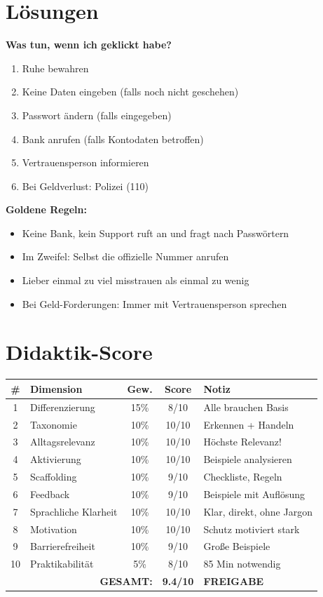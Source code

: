 \documentclass[11pt,a4paper]{article}
\begin{document}
\section{Lösungen}

\textbf{Was tun, wenn ich geklickt habe?}
\begin{enumerate}
    \item Ruhe bewahren
    \item Keine Daten eingeben (falls noch nicht geschehen)
    \item Passwort ändern (falls eingegeben)
    \item Bank anrufen (falls Kontodaten betroffen)
    \item Vertrauensperson informieren
    \item Bei Geldverlust: Polizei (110)
\end{enumerate}

\textbf{Goldene Regeln:}
\begin{itemize}
    \item Keine Bank, kein Support ruft an und fragt nach Passwörtern
    \item Im Zweifel: Selbst die offizielle Nummer anrufen
    \item Lieber einmal zu viel misstrauen als einmal zu wenig
    \item Bei Geld-Forderungen: Immer mit Vertrauensperson sprechen
\end{itemize}

\section{Didaktik-Score}

\begin{scorebox}
\begin{tabular}{|c|l|c|c|p{3.5cm}|}
\hline
\# & Dimension & Gew. & Score & Notiz \\
\hline
1 & Differenzierung & 15\% & 8/10 & Alle brauchen Basis \\
2 & Taxonomie & 10\% & 10/10 & Erkennen + Handeln \\
3 & Alltagsrelevanz & 10\% & 10/10 & Höchste Relevanz! \\
4 & Aktivierung & 10\% & 10/10 & Beispiele analysieren \\
5 & Scaffolding & 10\% & 9/10 & Checkliste, Regeln \\
6 & Feedback & 10\% & 9/10 & Beispiele mit Auflösung \\
7 & Sprachliche Klarheit & 10\% & 10/10 & Klar, direkt, ohne Jargon \\
8 & Motivation & 10\% & 10/10 & Schutz motiviert stark \\
9 & Barrierefreiheit & 10\% & 9/10 & Große Beispiele \\
10 & Praktikabilität & 5\% & 8/10 & 85 Min notwendig \\
\hline
\multicolumn{3}{|r|}{\textbf{GESAMT:}} & \textbf{9.4/10} & \textcolor{successgreen}{\textbf{FREIGABE}} \\
\hline
\end{tabular}
\end{scorebox}
\end{document}
